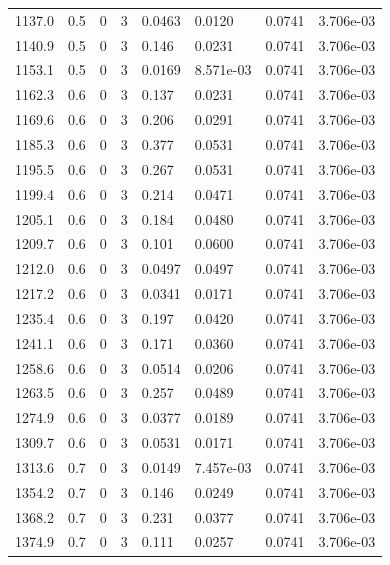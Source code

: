 \documentclass[preview]{standalone}
\begin{document}
{{{{\begin{tabular}{L{1.2cm}C{1.2cm} C{0.3cm}C{0.5cm} C{1.4cm}C{1.4cm} C{1.4cm}C{1.4cm}}
  1137.0  &   0.5  & 0     &  3 &  0.0463  & 0.0120  & 0.0741 &  3.706e-03   \\ 
  1140.9  &   0.5  & 0     &  3 &  0.146  & 0.0231  & 0.0741 &  3.706e-03   \\ 
  1153.1  &   0.5  & 0     &  3 &  0.0169  & 8.571e-03  & 0.0741 &  3.706e-03   \\ 
  1162.3  &   0.6  & 0     &  3 &  0.137  & 0.0231  & 0.0741 &  3.706e-03   \\ 
  1169.6  &   0.6  & 0     &  3 &  0.206  & 0.0291  & 0.0741 &  3.706e-03   \\ 
  1185.3  &   0.6  & 0     &  3 &  0.377  & 0.0531  & 0.0741 &  3.706e-03   \\ 
  1195.5  &   0.6  & 0     &  3 &  0.267  & 0.0531  & 0.0741 &  3.706e-03   \\ 
  1199.4  &   0.6  & 0     &  3 &  0.214  & 0.0471  & 0.0741 &  3.706e-03   \\ 
  1205.1  &   0.6  & 0     &  3 &  0.184  & 0.0480  & 0.0741 &  3.706e-03   \\ 
  1209.7  &   0.6  & 0     &  3 &  0.101  & 0.0600  & 0.0741 &  3.706e-03   \\ 
  1212.0  &   0.6  & 0     &  3 &  0.0497  & 0.0497  & 0.0741 &  3.706e-03   \\ 
  1217.2  &   0.6  & 0     &  3 &  0.0341  & 0.0171  & 0.0741 &  3.706e-03   \\ 
  1235.4  &   0.6  & 0     &  3 &  0.197  & 0.0420  & 0.0741 &  3.706e-03   \\ 
  1241.1  &   0.6  & 0     &  3 &  0.171  & 0.0360  & 0.0741 &  3.706e-03   \\ 
  1258.6  &   0.6  & 0     &  3 &  0.0514  & 0.0206  & 0.0741 &  3.706e-03   \\ 
  1263.5  &   0.6  & 0     &  3 &  0.257  & 0.0489  & 0.0741 &  3.706e-03   \\ 
  1274.9  &   0.6  & 0     &  3 &  0.0377  & 0.0189  & 0.0741 &  3.706e-03   \\ 
  1309.7  &   0.6  & 0     &  3 &  0.0531  & 0.0171  & 0.0741 &  3.706e-03   \\ 
  1313.6  &   0.7  & 0     &  3 &  0.0149  & 7.457e-03  & 0.0741 &  3.706e-03   \\ 
  1354.2  &   0.7  & 0     &  3 &  0.146  & 0.0249  & 0.0741 &  3.706e-03   \\ 
  1368.2  &   0.7  & 0     &  3 &  0.231  & 0.0377  & 0.0741 &  3.706e-03   \\ 
  1374.9  &   0.7  & 0     &  3 &  0.111  & 0.0257  & 0.0741 &  3.706e-03   \\ 

\end{tabular}}}}}
\end{document}
